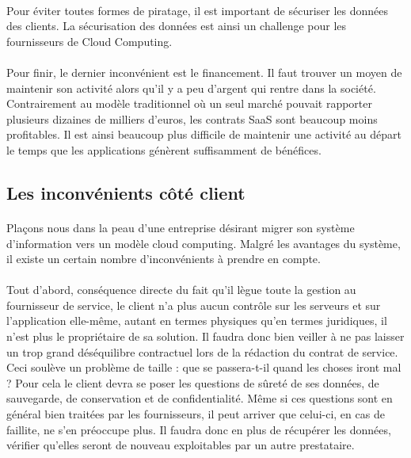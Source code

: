 \documentclass[a4paper,12pt]{report}
\begin{document}
\begin{onehalfspace}
	\paragraph*{}
	Pour éviter toutes formes de piratage, il est important de sécuriser les données des clients. La sécurisation des données est ainsi un challenge pour les fournisseurs de Cloud Computing. 
	
	\paragraph*{}
	Pour finir, le dernier inconvénient est le financement. Il faut trouver un moyen de maintenir son activité alors qu'il y a peu d'argent qui rentre dans la société. Contrairement au modèle traditionnel où un seul marché pouvait rapporter plusieurs dizaines de milliers d'euros, les contrats SaaS sont beaucoup moins profitables. Il est ainsi beaucoup plus difficile de maintenir une activité au départ le temps que les applications génèrent suffisamment de bénéfices.
	
	
	
	
	
	\subsection{Les inconvénients côté client}
	
	\paragraph*{}	
	Plaçons nous dans la peau d'une entreprise désirant migrer son système d'information vers un modèle cloud computing. Malgré les avantages du système, il existe un certain nombre d'inconvénients à prendre en compte.
	
	\paragraph*{}
	Tout d’abord, conséquence directe du fait qu’il lègue toute la gestion au fournisseur de service, le client n’a plus aucun contrôle sur les serveurs et sur l’application elle-même, autant en termes physiques qu’en termes juridiques, il n’est plus le propriétaire de sa solution. Il faudra donc bien veiller à ne pas laisser un trop grand déséquilibre contractuel lors de la rédaction du contrat de service.
Ceci soulève un problème de taille : que se passera-t-il quand les choses iront mal ? Pour cela le client devra se poser les questions de sûreté de ses données, de sauvegarde, de conservation et de confidentialité. Même si ces questions sont en général bien traitées par les fournisseurs, il peut arriver que celui-ci, en cas de faillite, ne s’en préoccupe plus. Il faudra donc en plus de récupérer les données, vérifier qu’elles seront de nouveau exploitables par un autre prestataire.


\end{onehalfspace}
\end{document}
